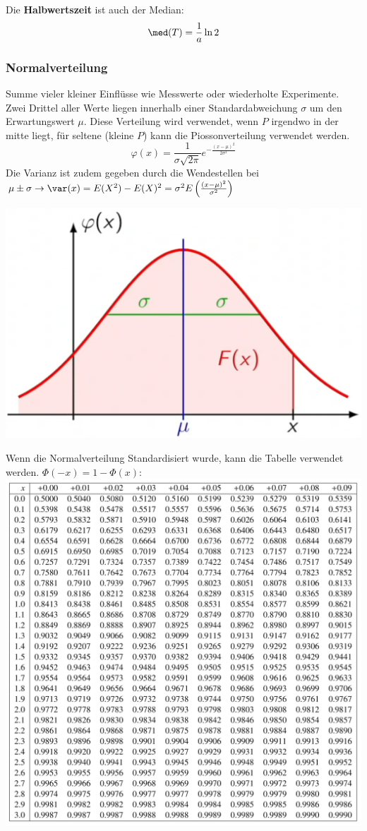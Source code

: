 \noindent Die \textbf{Halbwertszeit} ist auch der Median:
\[ \med(T) = \frac{1}{a}\ln2 \] 

\subsubsection{Normalverteilung}
Summe vieler kleiner Einflüsse wie Messwerte oder wiederholte Experimente. Zwei Drittel aller Werte liegen innerhalb einer Standardabweichung $\sigma$ um den Erwartungswert $\mu$. Diese Verteilung wird verwendet, wenn $P$ irgendwo in der mitte liegt, für seltene (kleine $P$) kann die Piossonverteilung verwendet werden.
\[
\varphi(x) = \frac{1}{\sigma\sqrt{2\pi}}e^{-\frac{(x-\mu)^2}{2\sigma^2}}
\]
\noindent Die Varianz ist zudem gegeben durch die Wendestellen bei $\mu \pm \sigma \rightarrow \var(x) = E(X^2) - E(X)^2 = \sigma^2E\left(\frac{(x - \mu)^2}{\sigma^2}\right)$

\begin{center}
	\includegraphics[width=0.6\columnwidth]{Images/normalverteilung}
\end{center}

\noindent Wenn die Normalverteilung Standardisiert wurde, kann die Tabelle verwendet werden. $\Phi(-x) = 1 - \Phi(x)$:\\
\includegraphics[width=\columnwidth]{Images/standard-normalverteilung}


